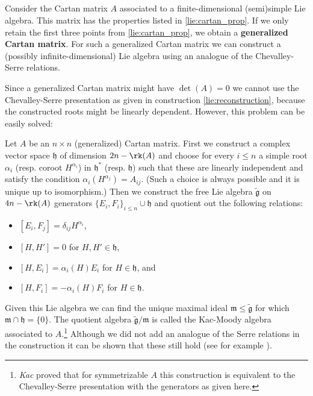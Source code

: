 \subsection{}

    \begin{construct}\label{lie:kac_moody}
        Consider the Cartan matrix $A$ associated to a finite-dimensional (semi)simple Lie algebra. This matrix has the properties listed in \ref{lie:cartan_prop}. If we only retain the first three points from \ref{lie:cartan_prop}, we obtain a \textbf{generalized Cartan matrix}. For such a generalized Cartan matrix we can construct a (possibly infinite-dimensional) Lie algebra using an analogue of the Chevalley-Serre relations.

        Since a generalized Cartan matrix might have $\det(A)=0$ we cannot use the Chevalley-Serre presentation as given in construction \ref{lie:reconstruction}, because the constructed roots might be linearly dependent. However, this problem can be easily solved:

        \qquad Let $A$ be an $n\times n$ (generalized) Cartan matrix. First we construct a complex vector space $\mathfrak{h}$ of dimension $2n-\rk(A)$ and choose for every $i\leq n$ a simple root $\alpha_i$ (resp. coroot $H^{\alpha_i}$) in $\mathfrak{h}^*$ (resp. $\mathfrak{h}$) such that these are linearly independent and satisfy the condition $\alpha_i(H^{\alpha_j})=A_{ij}$. (Such a choice is always possible and it is unique up to isomorphism.) Then we construct the free Lie algebra $\widetilde{\mathfrak{g}}$ on $4n-\rk(A)$ generators $\{E_i, F_i\}_{i\leq n}\cup\mathfrak{h}$ and quotient out the following relations:
        \begin{itemize}
            \item $[E_i,F_j] = \delta_{ij}H^{\alpha_i}$,
            \item $[H,H']=0$ for $H,H'\in\mathfrak{h}$,
            \item $[H,E_i]=\alpha_i(H)E_i$ for $H\in\mathfrak{h}$, and
            \item $[H,F_i]=-\alpha_i(H)F_i$ for $H\in\mathfrak{h}$.
        \end{itemize}
        Given this Lie algebra we can find the unique maximal ideal $\mathfrak{m}\leq\widetilde{\mathfrak{g}}$ for which $\mathfrak{m}\cap\mathfrak{h}=\{0\}$. The quotient algebra $\widetilde{\mathfrak{g}}/\mathfrak{m}$ is called the Kac-Moody algebra associated to $A$.\footnote{\textit{Kac} proved that for symmetrizable $A$ this construction is equivalent to the Chevalley-Serre presentation with the generators as given here.} Although we did not add an analogue of the Serre relations in the construction it can be shown that these still hold (see for example \cite{aminiinfinite}).
    \end{construct}
